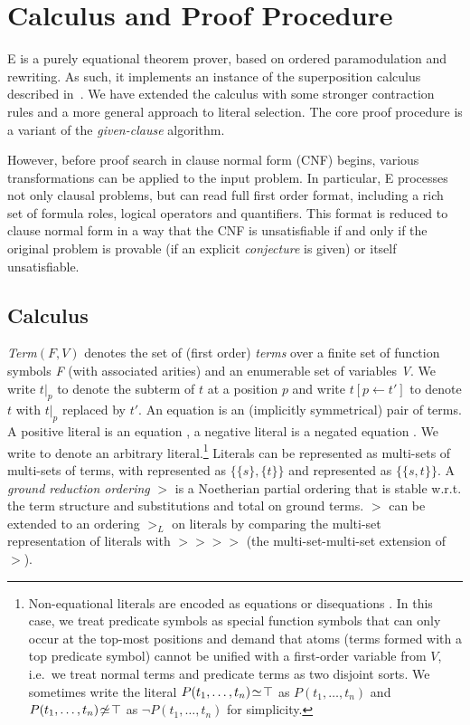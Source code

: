 \documentclass{report}
\begin{document}
\chapter{Calculus and Proof Procedure}
\label{sec:calculus}

E is a purely equational theorem prover, based on ordered
paramodulation and rewriting. As such, it implements an instance of
the superposition calculus described in~\cite{BG94}. We have extended
the calculus with some stronger contraction rules and a more general
approach to literal selection. The core proof procedure is a variant
of the \emph{given-clause} algorithm.

However, before proof search in clause normal form (CNF) begins,
various transformations can be applied to the input problem. In
particular, E processes not only clausal problems, but can read full
first order format, including a rich set of formula roles, logical
operators and quantifiers. This format is reduced to clause normal
form in a way that the CNF is unsatisfiable if and only if the
original problem is provable (if an explicit \emph{conjecture} is
given) or itself unsatisfiable.


\section{Calculus}

\emph{Term}$(F,V)$ denotes the set of (first order)
\emph{terms} over a finite set of function symbols \emph{F} (with
associated arities) and an enumerable set of variables
\emph{V}. We write $t|_p$ to denote the
subterm of $t$ at a position $p$ and write
$t[p\leftarrow t']$ to denote $t$ with $t|_p$ replaced by $t'$. An
equation  is an (implicitly symmetrical)
pair of terms. A positive literal is an equation
, a negative literal is a negated equation .  We
write  to denote an arbitrary
literal.\footnote{Non-equational literals are encoded as equations or
  disequations . In this case, we
  treat predicate symbols as special function symbols that can only
  occur at the top-most positions and demand that atoms (terms formed
  with a top predicate symbol) cannot be unified with a first-order
  variable from $V$, i.e.\ we treat normal terms and predicate terms
  as two disjoint sorts. We sometimes write the literal $P(t_1,
    \ldots, t_n)\!\simeq\!\top$ as $P(t_1, \ldots, t_n)$ and $P(t_1,
    \ldots, t_n)\!\not\simeq\!\top$ as $\neg P(t_1, \ldots, t_n)$ for
  simplicity.} Literals can be represented as multi-sets of multi-sets
of terms, with  represented as $\{\{s\},\{t\}\}$ and
 represented as $\{\{s, t\}\}$.  A \emph{ground reduction
  ordering} $>$ is a
Noetherian partial ordering that is stable w.r.t. the term structure
and substitutions and total on ground terms. $>$ can be extended to an
ordering $>_L$ on literals by comparing the multi-set representation
of literals with $>\!\!> >\!\!>$ (the multi-set-multi-set extension of
$>$).
\end{document}
